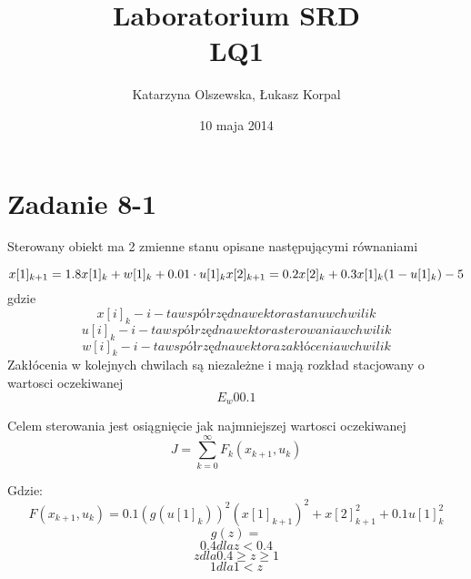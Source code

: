\documentclass[11pt,a4paper]{article}
\title{Laboratorium SRD\\LQ1}
\date{10 maja 2014}
\author{Katarzyna Olszewska, Łukasz Korpal}
\begin{document}
\maketitle
\newpage

\section*{Zadanie 8-1}
Sterowany obiekt ma 2 zmienne stanu opisane następującymi równaniami

\begin{displaymath}
x[1]_{k+1} = 1.8x[1]_k + w[1]_k + 0.01 \cdot u[1]_k \\
x[2]_{k+1} = 0.2x[2]_k + 0.3x[1]_k (1 - u[1]_k ) - 5
\end{displaymath}
gdzie
\begin{displaymath}
	x[i]_k - i-ta współrzędna wektora stanu w chwili k 
\end{displaymath}
\begin{displaymath}
u[i]_k - i-ta współrzędna wektora sterowania w chwili k
\end{displaymath}
\begin{displaymath}
w[i]_k - i-ta współrzędna wektora zakłócenia w chwili k
\end{displaymath}
Zakłócenia w kolejnych chwilach są niezależne i mają rozkład stacjowany o wartosci oczekiwanej
\begin{displaymath}
E_w 0 0.1
\end{displaymath}

Celem sterowania jest osiągnięcie jak najmniejszej wartosci oczekiwanej
\begin{displaymath}
J = \sum_{k=0}^{\infty}{F_k(x_{k+1},u_k)}
\end{displaymath}

Gdzie:
\begin{displaymath}
F(x_{k+1}, u_k) = 0.1 (g(u[1]_k))^2 (x[1]_{k+1})^2 + x[2]_{k+1}^2 + 0.1u[1]_k^2
\end{displaymath}
\begin{displaymath}
g(z)=
\end{displaymath}
\begin{displaymath}
	0.4 dla z<0.4
	\end{displaymath}
	\begin{displaymath}
	z dla 0.4 \geq z \geq 1
	\end{displaymath}
	\begin{displaymath}
	1 dla 1<z
\end{displaymath}
\end{document}
